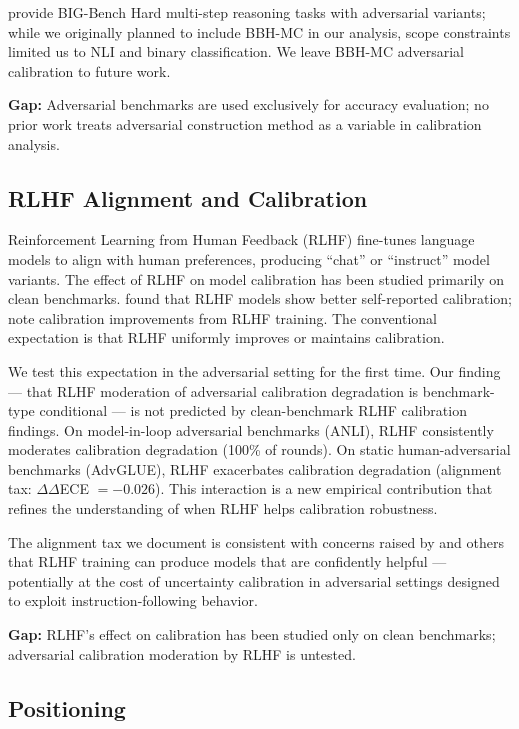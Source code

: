 \citet{suzgun2022challenging} provide BIG-Bench Hard multi-step reasoning tasks with adversarial variants; while we originally planned to include BBH-MC in our analysis, scope constraints limited us to NLI and binary classification. We leave BBH-MC adversarial calibration to future work.

\textbf{Gap:} Adversarial benchmarks are used exclusively for accuracy evaluation; no prior work treats adversarial construction method as a variable in calibration analysis.

\subsection{RLHF Alignment and Calibration}

Reinforcement Learning from Human Feedback (RLHF) \citep{christiano2017deep,ouyang2022training} fine-tunes language models to align with human preferences, producing ``chat'' or ``instruct'' model variants. The effect of RLHF on model calibration has been studied primarily on clean benchmarks. \citet{kadavath2022language} found that RLHF models show better self-reported calibration; \citet{openai2023gpt4} note calibration improvements from RLHF training. The conventional expectation is that RLHF uniformly improves or maintains calibration.

We test this expectation in the adversarial setting for the first time. Our finding --- that RLHF moderation of adversarial calibration degradation is benchmark-type conditional --- is not predicted by clean-benchmark RLHF calibration findings. On model-in-loop adversarial benchmarks (ANLI), RLHF consistently moderates calibration degradation (100\% of rounds). On static human-adversarial benchmarks (AdvGLUE), RLHF exacerbates calibration degradation (alignment tax: $\Delta\Delta$ECE $= -0.026$). This interaction is a new empirical contribution that refines the understanding of when RLHF helps calibration robustness.

The alignment tax we document is consistent with concerns raised by \citet{askell2021general} and others that RLHF training can produce models that are confidently helpful --- potentially at the cost of uncertainty calibration in adversarial settings designed to exploit instruction-following behavior.

\textbf{Gap:} RLHF's effect on calibration has been studied only on clean benchmarks; adversarial calibration moderation by RLHF is untested.

\subsection{Positioning}

